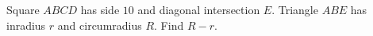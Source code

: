 Square $ABCD$ has side $10$ and diagonal intersection $E$. Triangle $ABE$ has inradius $r$ and circumradius $R$. Find $R-r$.
